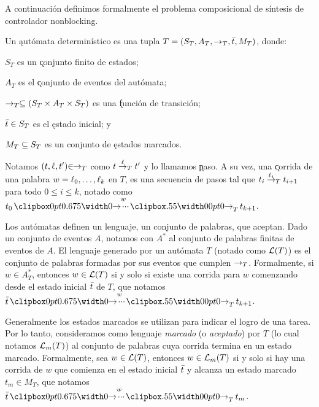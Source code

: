 A continuación definimos formalmente el problema composicional de síntesis de controlador nonblocking.

\begin{definition} \label{def:automata}
	Un \k{autómata determinístico} es una tupla $T = (S_T, A_T, \rightarrow_T, \bar{t}, M_T)$, donde:
	\begin{itemize*}[label=]
		
		\item $S_T$ es un \k{conjunto finito de estados};
		
		\item $A_T$ es el \k{conjunto de eventos} del autómata;
		
		\item $\rightarrow_T \subseteq (S_T \times A_T \times S_T)$ es una \k{función de transición};
		
		\item $\bar{t} \in S_T$ es el \k{estado inicial}; y
		
		\item $M_T \subseteq S_T$ es un conjunto de \k{estados marcados}.
		
	\end{itemize*}
	
\end{definition}

\begin{notation} \label{not:paso}
	
	$\!\!$Notamos $(t,\ell,t') {\in}\!\! \rightarrow_T$ como $t \overset{\ell}{\rightarrow}_{T} t'$ y lo llamamos \k{paso}.
	A su vez, una \k{corrida} de una palabra $w = \ell_0,\ldots,\ell_k$ en $T$, es una secuencia de pasos tal que $t_i \overset{\ell_i}{\rightarrow}_{T} t_{i+1}$ para todo $0 \leq i \leq k$, notado como $t_0 \runw{w}{T} t_{k+1}$.
	
\end{notation}

Los autómatas definen un lenguaje, un conjunto de palabras, que aceptan. Dado un conjunto de eventos $A$, notamos con $A^*$ al conjunto de palabras finitas de eventos de $A$. El lenguaje generado por un autómata $T$ (notado como $\mathcal{L}(T)$) es el conjunto de palabras formadas por sus eventos que cumplen $\rightarrow_T$. Formalmente, si $w \in A_T^*$, entonces $w \in \mathcal{L}(T)$ si y solo si existe una corrida para $w$ comenzando desde el estado inicial $\bar{t}$ de $T$, que notamos $\init{t} \runw{w}{T} t_{k+1}$.

Generalmente los estados marcados se utilizan para indicar el logro de una tarea. Por lo tanto, consideramos como lenguaje \textit{marcado} (o \textit{aceptado}) por $T$ (lo cual notamos $\mathcal{L}_m(T)$) al conjunto de palabras cuya corrida termina en un estado marcado. Formalmente, sea $w \in \mathcal{L}(T)$, entonces $w \in \mathcal{L}_m(T)$ si y solo si hay una corrida de $w$ que comienza en el estado inicial $\bar{t}$ y alcanza un estado marcado $t_m \in M_T$, que notamos $\init{t} \runw{w}{T} t_m$.

